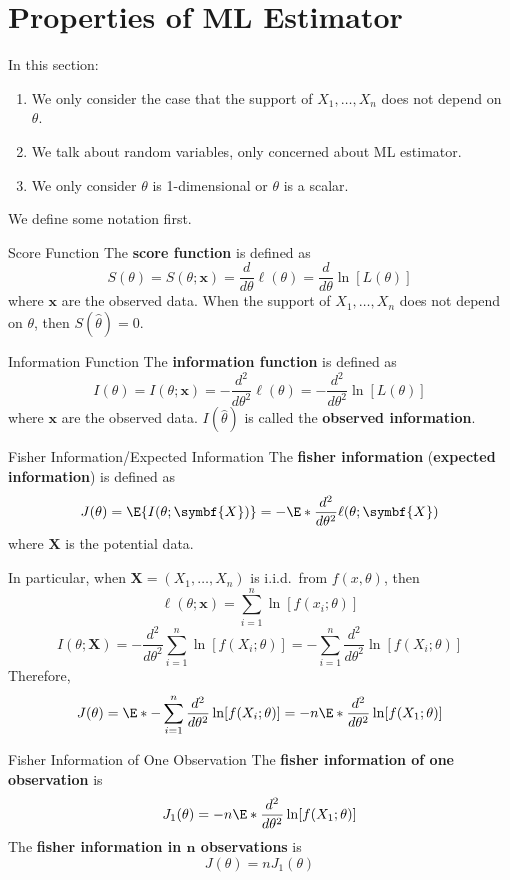 \section{Properties of ML Estimator}
In this section:
\begin{enumerate}
    \item We only consider the case that the support of $ X_1,\ldots,X_n $
          does not depend on $ \theta $.
    \item We talk about random variables, only concerned
          about ML estimator.
    \item We only consider $ \theta $ is 1-dimensional or $ \theta $
          is a scalar.
\end{enumerate}
We define some notation first.
\begin{Definition}{Score Function}{}
    The \textbf{score function} is defined as
    \[ S(\theta)=S(\theta;\symbf{x})=
        \frac{d}{d\theta}\ell(\theta)=
        \frac{d}{d\theta}\ln[L(\theta)]   \]
    where $ \symbf{x} $ are the observed data.
    When the support of $ X_1,\ldots,X_n $ does not depend
    on $ \theta $, then $ S(\hat{\theta})=0 $.
\end{Definition}
\begin{Definition}{Information Function}{}
    The \textbf{information function} is defined as
    \[ I(\theta)=I(\theta;\symbf{x})=-\frac{d^2}{d\theta^2}\ell(\theta)=
        -\frac{d^2}{d\theta^2}\ln[L(\theta)]   \]
    where $ \symbf{x} $ are the observed data. $ I(\hat{\theta}) $
    is called the \textbf{observed information}.
\end{Definition}
\begin{Definition}{Fisher Information/Expected Information}{}
    The \textbf{fisher information} (\textbf{expected information})
    is defined as
    \[ J(\theta)=\E{I(\theta;\symbf{X})}=-\E*{\frac{d^2}{d\theta^2}\ell(\theta;
            \symbf{X}) } \]
    where $ \symbf{X} $ is the potential data.

    In particular, when $ \symbf{X}=(X_1,\ldots,X_n) $
    is i.i.d.\ from $ f(x,\theta) $, then
    \[ \ell(\theta;\symbf{x})=\sum_{i=1}^{n} \ln[f(x_i;\theta)] \]
    \[ I(\theta;\symbf{X})=-\frac{d^2
        }{d\theta^2} \sum_{i=1}^{n}\ln[f(X_i;\theta)]
        =-\sum_{i=1}^{n} \frac{d^2}{d\theta^2}\ln[f(X_i;\theta)]   \]
    Therefore,
    \[ J(\theta)=\E*{-\sum_{i=1}^{n} \frac{d^2}{d\theta^2}\ln[f(X_i;\theta)]}
        =-n\E*{\frac{d^2}{d\theta^2}\ln[f(X_1;\theta)]} \]
\end{Definition}
\begin{Definition}{Fisher Information of One Observation}{}
    The \textbf{fisher information of one observation}
    is
    \[ J_1(\theta)=-n\E*{\frac{d^2}{d\theta^2}\ln[f(X_1;\theta)]}  \]
    The \textbf{fisher information in $ \symbf{n} $ observations} is
    \[ J(\theta)=n J_1(\theta) \]
\end{Definition}
